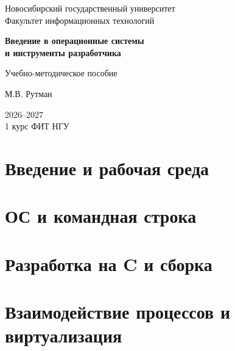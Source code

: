 \documentclass[12pt,a4paper,openany]{book}
\begin{document}
\frontmatter
\clearpage
\begin{titlepage}
  \begin{center}
    \vspace*{2.5cm}
    {\LARGE Новосибирский государственный университет\\[0.3em]
    Факультет информационных технологий\par}
    \vspace{3cm}
    {\Huge\bfseries
      Введение в операционные системы\\[0.4em]
      и инструменты разработчика\par}
    \vspace{1.5cm}
    {\Large Учебно-методическое пособие\par}
    \vspace{3cm}
    {\large М.В. Рутман\par}
    \vspace{2cm}
    {\Large 2026--2027\\[0.4em]
    1 курс ФИТ НГУ\par}
  \end{center}
\end{titlepage}

\setcounter{tocdepth}{2}
\tableofcontents
\clearpage

\mainmatter
\part{Введение и рабочая среда}



\part{ОС и командная строка}











\part{Разработка на C и сборка}






\part{Взаимодействие процессов и виртуализация}






\end{document}
